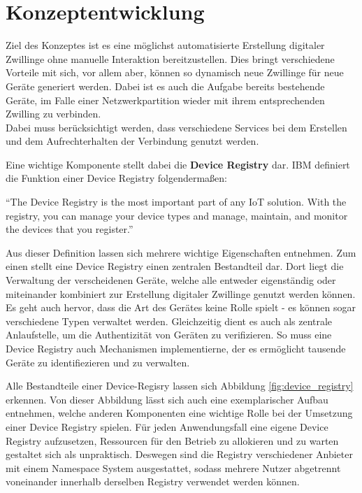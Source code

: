 \chapter{Konzeptentwicklung}

Ziel des Konzeptes ist es eine möglichst automatisierte Erstellung digitaler Zwillinge ohne manuelle Interaktion bereitzustellen. Dies bringt verschiedene Vorteile mit sich, vor allem aber, können so dynamisch neue Zwillinge für neue Geräte generiert werden. Dabei ist es auch die Aufgabe bereits bestehende Geräte, im Falle einer Netzwerkpartition wieder mit ihrem entsprechenden Zwilling zu verbinden.\\
Dabei muss berücksichtigt werden, dass verschiedene Services bei dem Erstellen und dem Aufrechterhalten der Verbindung genutzt werden.

Eine wichtige Komponente stellt dabei die \textbf{Device Registry} dar. IBM definiert die Funktion einer Device Registry folgendermaßen:

\begin{definition}
    \enquote{The Device Registry is the most important part of any IoT solution. With the registry, you can manage your device types and manage, maintain, and monitor the devices that you register.}\autocite{ibm_dr}\label{def:device_registry}
\end{definition}

Aus dieser Definition lassen sich mehrere wichtige Eigenschaften entnehmen. Zum einen stellt eine Device Registry einen zentralen Bestandteil dar. Dort liegt die Verwaltung der verscheidenen Geräte, welche alle entweder eigenständig oder miteinander kombiniert zur Erstellung digitaler Zwillinge genutzt werden können. Es geht auch hervor, dass die Art des Gerätes keine Rolle spielt - es können sogar verschiedene Typen verwaltet werden. Gleichzeitig dient es auch als zentrale Anlaufstelle, um die Authentizität von Geräten zu verifizieren. So muss eine Device Registry auch Mechanismen implementierne, der es ermöglicht tausende Geräte zu identifiezieren und zu verwalten.

Alle Bestandteile einer Device-Regisry lassen sich Abbildung \vref{fig:device_registry} erkennen. Von dieser Abbildung lässt sich auch eine exemplarischer Aufbau entnehmen, welche anderen Komponenten eine wichtige Rolle bei der Umsetzung einer Device Registry spielen. Für jeden Anwendungsfall eine eigene Device Registry aufzusetzen, Ressourcen für den Betrieb zu allokieren und zu warten gestaltet sich als unpraktisch. 
Deswegen sind die Registry verschiedener Anbieter  mit einem Namespace System ausgestattet, sodass mehrere Nutzer abgetrennt voneinander innerhalb derselben Registry verwendet werden können.

